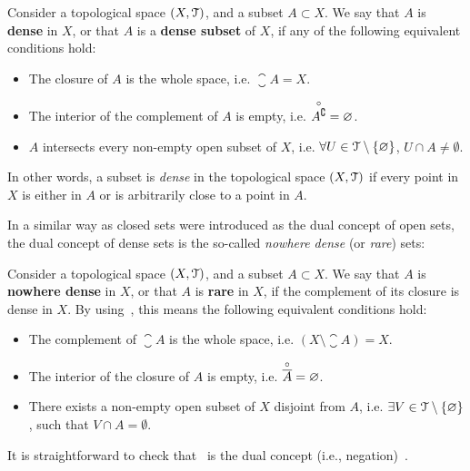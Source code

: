 \begin{definition}
	\label{def:dense-set}
	Consider a topological space $(X, \EuScript{T})$, and a subset $A\subset X$. We say that $A$ is \textbf{dense} in $X$, or that $A$ is a \textbf{dense subset} of $X$, if any of the following equivalent conditions hold:
	\begin{itemize}
		\item The closure of $A$ is the whole space, i.e. $\closure{A}=X$.
		\item The interior of the complement of $A$ is empty, i.e. $\overset{\circ}{A^\complement}=\varnothing$.
		\item $A$ intersects every non-empty open subset of $X$, i.e. $\forall U\in\EuScript{T}\setminus\{\varnothing\}$, $U\cap A\neq\emptyset$.
	\end{itemize}
\end{definition}

\begin{remark}
	In other words, a subset is \emph{dense} in the topological space $(X,\EuScript{T})$ if every point in $X$ is either in $A$ or is arbitrarily close to a point in $A$.
\end{remark}

In a similar way as closed sets were introduced as the dual concept of open sets, the dual concept of dense sets is the so-called \emph{nowhere dense} (or \emph{rare}) sets:

\begin{definition}
	\label{def:nowhere-dense-set}
	Consider a topological space $(X, \EuScript{T})$, and a subset $A\subset X$. We say that $A$ is \textbf{nowhere dense} in $X$, or that $A$ is \textbf{rare} in $X$, if the complement of its closure is dense in $X$. By using~, this means the following equivalent conditions hold:
	\begin{itemize}
		\item The complement of $\closure{A}$ is the whole space, i.e. $(X\setminus \closure{A}) = X$.
		\item The interior of the closure of $A$ is empty, i.e. $\overset{\circ}{\overline{A}}=\varnothing$.
		\item There exists a non-empty open subset of $X$ disjoint from $A$, i.e. $\exists V\in\EuScript{T}\setminus\{\varnothing\}$, such that $V\cap A=\emptyset$.
	\end{itemize}
\end{definition}

It is straightforward to check that~ is the dual concept (i.e., negation)~.

